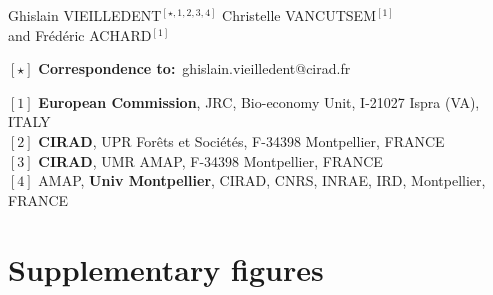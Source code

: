 \documentclass[
  12pt,
]{article}
\begin{document}
\vspace{1cm}

\begin{center}
  \large{
  Ghislain VIEILLEDENT$^{[\star, 1, 2, 3, 4]}$ \hspace{0.5cm} Christelle VANCUTSEM$^{[1]}$\\
  \vspace{0.5cm}
  and \hspace{0.5cm} Frédéric ACHARD$^{[1]}$
  }
\end{center}

\vspace{0.5cm}

\begin{center}
  $[\star]$ \textbf{Correspondence to:}~ghislain.vieilledent@cirad.fr\\
\end{center}

\vspace{0.5cm}

{\small
  \begin{flushleft}
    $[1]$ \textbf{European Commission}, JRC, Bio-economy Unit, I-21027 Ispra (VA), ITALY\\
    $[2]$ \textbf{CIRAD}, UPR Forêts et Sociétés, F-34398 Montpellier, FRANCE\\
    $[3]$ \textbf{CIRAD}, UMR AMAP, F-34398 Montpellier, FRANCE\\
    $[4]$ AMAP, \textbf{Univ Montpellier}, CIRAD, CNRS, INRAE, IRD, Montpellier, FRANCE\\
  \end{flushleft}}







\newpage

\hypertarget{supplementary-figures}{%
\section{Supplementary figures}\label{supplementary-figures}}
\end{document}
